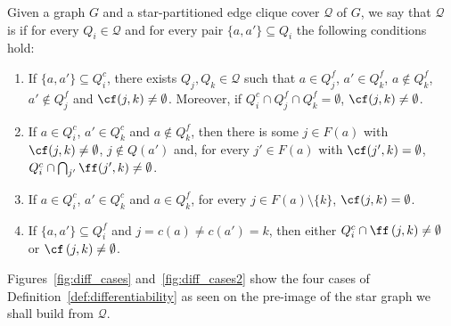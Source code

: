\begin{definition}
    \label{def:differentiability}
    Given a graph $G$ and a star-partitioned edge clique cover $\mathcal{Q}$ of $G$, we say that $\mathcal{Q}$ is  if for every $Q_i \in \mathcal{Q}$ and for every pair $\{a, a'\} \subseteq Q_i$ the following conditions hold:
    \begin{enumerate}
        \item If $\{a, a'\} \subseteq Q_i^c$, there exists $Q_j, Q_k \in \mathcal{Q}$ such that $a \in Q_j^f$, $a' \in Q_k^f$, $a \notin Q_k^f$, $a' \notin Q_j^f$ and $\cf(j,k) \neq \emptyset$. Moreover, if $Q_i^c \cap Q_j^f \cap Q_k^f = \emptyset$, $\cf(j,k) \neq \emptyset$.
        \item If $a \in Q_i^c$, $a' \in Q_k^c$ and $a \notin Q_k^f$, then there is some $j \in F(a)$ with $\cf(j,k) \neq \emptyset$, $j \notin Q(a')$ and, for every $j' \in F(a)$ with $\cf(j',k) = \emptyset$, $Q_i^c \cap \bigcap_{j'} \ff(j',k) \neq \emptyset$.
        \item If $a \in Q_i^c$, $a' \in Q_k^c$ and $a \in Q_k^f$, for every $j \in F(a) \setminus \{k\}$, $\cf(j,k) = \emptyset$.
        \item If $\{a, a'\} \subseteq Q_i^f$ and $j = c(a) \neq c(a') = k$, then either $Q_i^c \cap \ff\left(j,k\right) \neq \emptyset$ or $\cf\left(j,k\right) \neq \emptyset$.
    \end{enumerate}
\end{definition}

Figures~\ref{fig:diff_cases} and~\ref{fig:diff_cases2} show the four cases of Definition~\ref{def:differentiability} as seen on the pre-image of the star graph we shall build from $\mathcal{Q}$.

